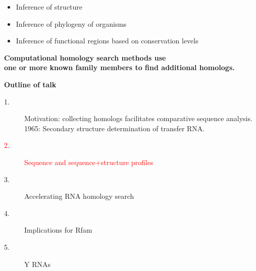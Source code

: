 \documentclass[landscape]{slides}
\begin{document}
\begin{slide}


\begin{itemize}
\item Inference of  structure
\item Inference of phylogeny of organisms
\item Inference of functional regions based on conservation levels
\end{itemize}

\medskip
\medskip
\normalsize
\begin{center}
\textbf{Computational homology search methods use \\ one or more known
family members to find additional homologs.}
\end{center}

\vfill
\end{slide}
\begin{slide}
\begin{center}
\textbf{Outline of talk}

\begin{description}
\item[1.] Motivation: collecting homologs facilitates comparative
  sequence analysis.\\ 1965: Secondary structure determination of
  transfer RNA.
\item[\textcolor{red}{2.}] \textcolor{red}{Sequence and sequence+structure profiles}
\item[3.] Accelerating RNA homology search
\item[4.] Implications for Rfam
\item[5.] Y RNAs
\end{description}

\end{center}
\vfill
\end{slide}
\end{document}
